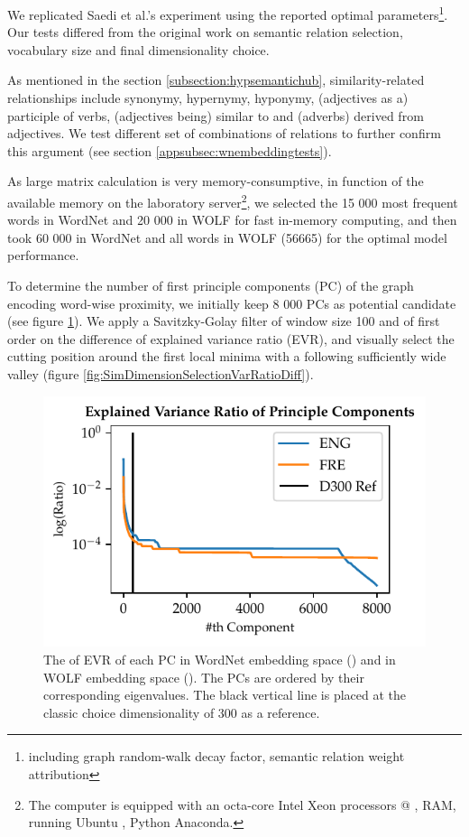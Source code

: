 We replicated Saedi et al.'s experiment using the reported optimal parameters\footnote{including graph random-walk decay factor, semantic relation weight attribution}. Our tests differed from the original work on semantic relation selection, vocabulary size and final dimensionality choice. 

As mentioned in the section \ref{subsection:hypsemantichub}, similarity-related relationships include synonymy, hypernymy, hyponymy, (adjectives as a) participle of verbs, (adjectives being) similar to and (adverbs) derived from adjectives. We test different set of combinations of relations to further confirm this argument (see section \ref{appsubsec:wnembeddingtests}).

As large matrix calculation is very memory-consumptive, in function of the available memory on the laboratory server\footnote{The computer is equipped with an octa-core Intel Xeon processors @ ,  RAM, running Ubuntu , Python  Anaconda.}, we selected the 15 000 most frequent words in WordNet and 20 000 in WOLF for fast in-memory computing, and then took 60 000 in WordNet and all words in WOLF (56665) for the optimal model performance. 

To determine the number of first principle components (PC) of the graph encoding word-wise proximity, we initially keep 8 000 PCs as potential candidate (see figure \ref{fig:SimDimensionSeletionVarRatio}). We apply a Savitzky-Golay filter of window size 100 and of first order on the difference of explained variance ratio (EVR), and visually select the cutting position around the first local minima with a following sufficiently wide valley (figure \ref{fig:SimDimensionSelectionVarRatioDiff}).

\begin{figure}
    \centering
    \includegraphics[scale=1]{Figures/SimDimensionSelectionVarRatio.pdf}
    \caption[Explained Variance Ratio of WordNet Embedding Principle Components]{The  of EVR of each PC in WordNet embedding space () and in WOLF embedding space (). The PCs are ordered by their corresponding eigenvalues. The black vertical line is placed at the classic choice dimensionality of 300 as a reference.}
    \label{fig:SimDimensionSeletionVarRatio}
\end{figure}

